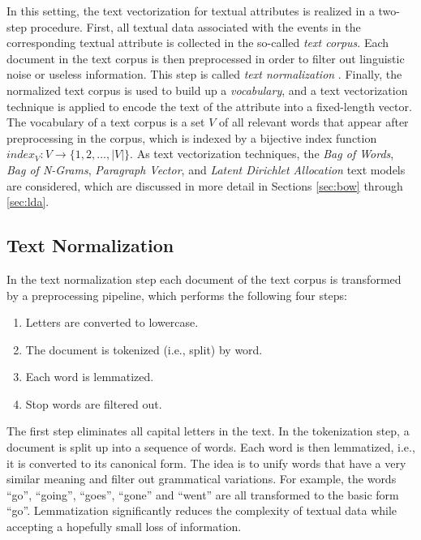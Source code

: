 In this setting, the text vectorization for textual attributes is realized in a two-step procedure.
First, all textual data associated with the events in the corresponding textual attribute is collected in the so-called \textit{text corpus}.
Each document in the text corpus is then preprocessed in order to filter out linguistic noise or useless information.
This step is called \textit{text normalization}  \cite{DBLP:books/lib/JurafskyM09}.
Finally, the normalized text corpus is used to build up a \textit{vocabulary}, and a text vectorization technique is applied to encode the text of the attribute into a fixed-length vector.
The vocabulary of a text corpus is a set $V$ of all relevant words that appear after preprocessing in the corpus, which is indexed by a bijective index function $index_V \colon V \to \{1, 2, \dots, |V|\}$.
As text vectorization techniques, the \textit{Bag of Words}, \textit{Bag of N-Grams}, \textit{Paragraph Vector}, and \textit{Latent Dirichlet Allocation} text models are considered, which are discussed in more detail in Sections \ref{sec:bow} through \ref{sec:lda}.

\subsection{Text Normalization}

In the text normalization step each document of the text corpus is transformed by a preprocessing pipeline, which performs the following four steps:
\begin{enumerate} 
	\item Letters are converted to lowercase.
	\item The document is tokenized (i.e., split) by word.
	\item Each word is lemmatized.
	\item Stop words are filtered out.
\end{enumerate}
The first step eliminates all capital letters in the text.
In the tokenization step, a document is split up into a sequence of words.
Each word is then lemmatized, i.e., it is converted to its canonical form.
The idea is to unify words that have a very similar meaning and filter out grammatical variations.
For example, the words   \enquote{go}, \enquote{going}, \enquote{goes}, \enquote{gone} and   \enquote{went} are all transformed to the basic form   \enquote{go}.
Lemmatization significantly reduces the complexity of textual data while accepting a hopefully small loss of information.

